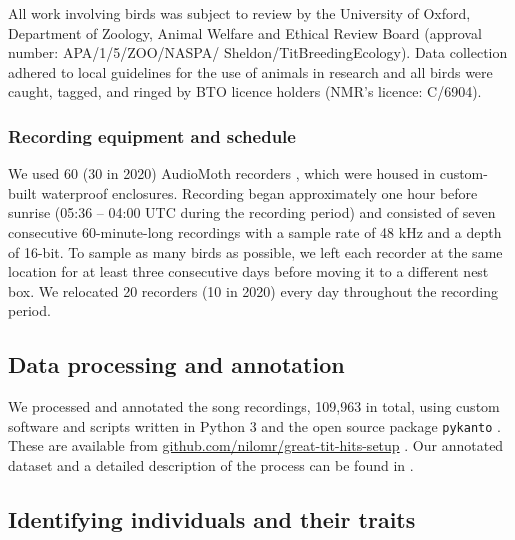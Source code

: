 All work involving birds was subject to review by the University of Oxford, Department of Zoology, Animal Welfare and Ethical Review Board (approval number: APA/1/5/ZOO/NASPA/ Sheldon/TitBreedingEcology). Data collection adhered to local guidelines for the use of animals in research and all birds were caught, tagged, and ringed by BTO licence holders (NMR's licence: C/6904).

\subsubsection{Recording equipment and schedule}
We used 60 (30 in 2020) AudioMoth recorders \parencite{hill2019}, which were housed in custom-built waterproof enclosures. Recording began approximately one hour before sunrise (05:36 -- 04:00 UTC during the recording period) and consisted of seven consecutive 60-minute-long recordings with a sample rate of 48 kHz and a depth of 16-bit. To sample as many birds as possible, we left each recorder at the same location for at least three consecutive days before moving it to a different nest box. We relocated 20 recorders (10 in 2020) every day throughout the recording period.

\subsection{Data processing and annotation}

We processed and annotated the song recordings, 109,963 in total, using custom software and scripts written in Python 3 \parencite{vanrossum1995} and the open source package \texttt{pykanto} \parencite{merinorecalde2023}. These are available from \href{https://github.com/nilomr/great-tit-hits-setup}{github.com/nilomr/great-tit-hits-setup} \parencite{nilo_gretidataset_setup_2023}. Our annotated dataset and a detailed description of the process can be found in \textcite{merinorecalde2023a}.

\subsection{Identifying individuals and their traits}

